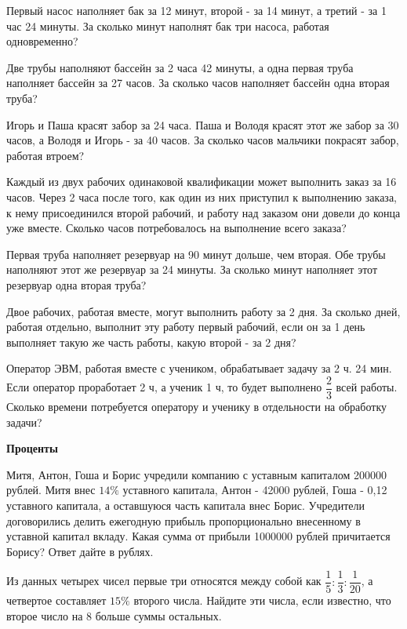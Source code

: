  Первый насос наполняет бак за 12 минут, второй - за 14 минут, а третий - за 1 час 24 минуты. За сколько минут наполнят бак три насоса, работая одновременно?


 Две трубы наполняют бассейн за 2 часа 42 минуты, а одна первая труба наполняет бассейн за 27 часов. За сколько часов наполняет бассейн одна вторая труба?


 Игорь и Паша красят забор за 24 часа. Паша и Володя красят этот же забор за 30 часов, а Володя и Игорь - за 40 часов. За сколько часов мальчики покрасят забор, работая втроем?


 Каждый из двух рабочих одинаковой квалификации может выполнить заказ за 16 часов. Через 2 часа после того, как один из них приступил к выполнению заказа, к нему присоединился второй рабочий, и работу над заказом они довели до конца уже вместе. Сколько часов потребовалось на выполнение всего заказа?


 Первая труба наполняет резервуар на 90 минут дольше, чем вторая. Обе трубы наполняют этот же резервуар за 24 минуты. За сколько минут наполняет этот резервуар одна вторая труба?


 Двое рабочих, работая вместе, могут выполнить работу за 2 дня. За сколько дней, работая отдельно, выполнит эту работу первый рабочий, если он за 1 день выполняет такую же часть работы, какую второй - за 2 дня?


 Оператор ЭВМ, работая вместе с учеником, обрабатывает задачу за 2 ч. 24 мин. Если оператор проработает 2 ч, а ученик 1 ч, то будет выполнено $\dfrac{2}{3}$ всей работы. Сколько времени потребуется оператору и ученику в отдельности на обработку задачи?

\hspace{3mm}

\centerline{\bf \Huge Проценты}

 Митя, Антон, Гоша и Борис учредили компанию с уставным капиталом 200000 рублей. Митя внес $14 \%$ уставного капитала, Антон - 42000 рублей, Гоша - 0,12 уставного капитала, а оставшуюся часть капитала внес Борис. Учредители договорились делить ежегодную прибыль пропорционально внесенному в уставной капитал вкладу. Какая сумма от прибыли 1000000 рублей причитается Борису? Ответ дайте в рублях.


 Из данных четырех чисел первые три относятся между собой как $\dfrac{1}{5}: \dfrac{1}{3}: \dfrac{1}{20}$, а четвертое составляет $15 \%$ второго числа. Найдите эти числа, если известно, что второе число на 8 больше суммы остальных.


